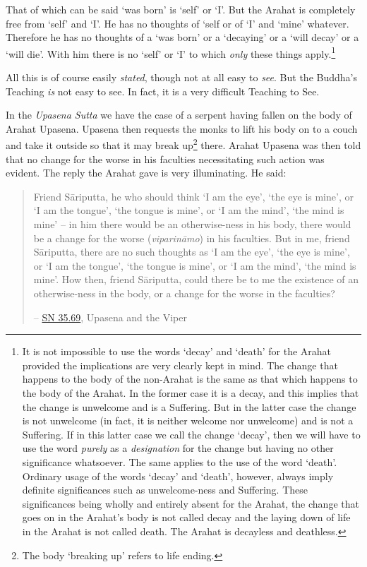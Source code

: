 That of which can be said `was born' is `self' or `I'. But the Arahat is completely free from `self' and `I'. He has no thoughts of `self or of `I' and `mine' whatever. Therefore he has no thoughts of a `was born' or a `decaying' or a `will decay' or a `will die'. With him there is no `self' or `I' to which \emph{only} these things apply.\footnote{It is not impossible to use the words `decay' and `death' for the Arahat provided the implications are very clearly kept in mind. The change that happens to the body of the non-Arahat is the same as that which happens to the body of the Arahat. In the former case it is a decay, and this implies that the change is unwelcome and is a Suffering. But in the latter case the change is not unwelcome (in fact, it is neither welcome nor unwelcome) and is not a Suffering. If in this latter case we call the change `decay', then we will have to use the word \emph{purely} as a \emph{designation} for the change but having no other significance whatsoever. The same applies to the use of the word `death'. Ordinary usage of the words `decay' and `death', however, always imply definite significances such as unwelcome-ness and Suffering. These significances being wholly and entirely absent for the Arahat, the change that goes on in the Arahat's body is not called decay and the laying down of life in the Arahat is not called death. The Arahat is decayless and deathless.}

All this is of course easily \emph{stated}, though not at all easy to \emph{see}. But the Buddha's Teaching \emph{is} not easy to see. In fact, it is a very difficult Teaching to See.

In the \textit{Upasena Sutta} we have the case of a serpent having fallen on the body of Arahat Upasena. Upasena then requests the monks to lift his body on to a couch and take it outside so that it may break up\footnote{The body `breaking up' refers to life ending.} there. Arahat Upasena was then told that no change for the worse in his faculties necessitating such action was evident. The reply the Arahat gave is very illuminating. He said:

\begin{quote}
Friend Sāriputta, he who should think `I am the eye', `the eye is mine', or `I am the tongue', `the tongue is mine', or `I am the mind', `the mind is mine' -- in him there would be an otherwise-ness in his body, there would be a change for the worse (\textit{viparināmo}) in his faculties. But in me, friend Sāriputta, there are no such thoughts as `I am the eye', `the eye is mine', or `I am the tongue', `the tongue is mine', or `I am the mind', `the mind is mine'. How then, friend Sāriputta, could there be to me the existence of an otherwise-ness in the body, or a change for the worse in the faculties?

 -- \href{https://suttacentral.net/sn35.69/en/sujato}{SN 35.69}, Upasena and the Viper
\end{quote}

